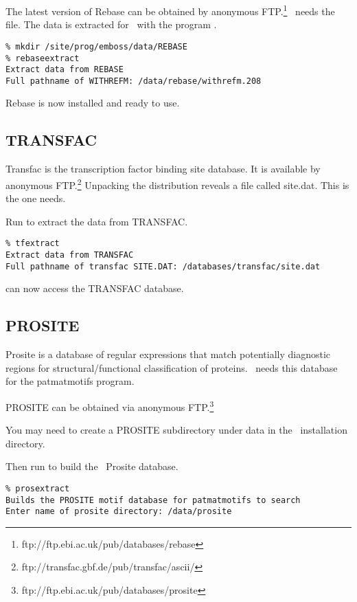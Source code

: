 \documentclass{report}
\begin{document}
The latest version of Rebase can be obtained by anonymous
FTP.\footnote{ftp://ftp.ebi.ac.uk/pub/databases/rebase} \EMBOSS\ needs
the  file. The data is extracted for \EMBOSS\ with
the program .

\begin{verbatim}
% mkdir /site/prog/emboss/data/REBASE
% rebaseextract
Extract data from REBASE
Full pathname of WITHREFM: /data/rebase/withrefm.208
\end{verbatim}

Rebase is now installed and ready to use.

\subsection{TRANSFAC}

Transfac is the transcription factor binding site database. It is
available by anonymous
FTP.\footnote{ftp://transfac.gbf.de/pub/transfac/ascii/} Unpacking the
distribution reveals a file called site.dat. This is the one \EMBOSS
needs.

Run  to extract the data from TRANSFAC.

\begin{verbatim}
% tfextract
Extract data from TRANSFAC
Full pathname of transfac SITE.DAT: /databases/transfac/site.dat
\end{verbatim}

 can now access the TRANSFAC database.

\subsection{PROSITE}

Prosite is a database of regular expressions that match potentially
diagnostic regions for structural/functional classification of
proteins. \EMBOSS\ needs this database for the patmatmotifs program.

PROSITE can be obtained via anonymous
FTP.\footnote{ftp://ftp.ebi.ac.uk/pub/databases/prosite}

You may need to create a PROSITE subdirectory under data in the
\EMBOSS\ installation directory.

Then run  to build the \EMBOSS\ Prosite database.

\begin{verbatim}
% prosextract
Builds the PROSITE motif database for patmatmotifs to search
Enter name of prosite directory: /data/prosite
\end{verbatim}
\end{document}
